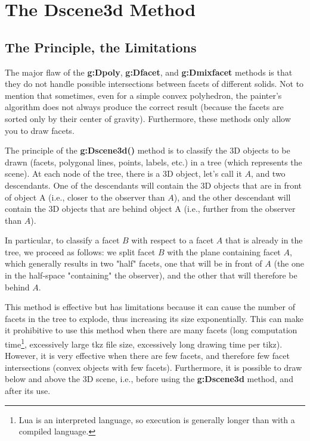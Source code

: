 \section{The Dscene3d Method}

\subsection{The Principle, the Limitations}

The major flaw of the \textbf{g:Dpoly}, \textbf{g:Dfacet}, and \textbf{g:Dmixfacet} methods is that they do not handle possible intersections between facets of different solids. Not to mention that sometimes, even for a simple convex polyhedron, the painter's algorithm does not always produce the correct result (because the facets are sorted only by their center of gravity). Furthermore, these methods only allow you to draw facets.

The principle of the \textbf{g:Dscene3d()} method is to classify the 3D objects to be drawn (facets, polygonal lines, points, labels, etc.) in a tree (which represents the scene). At each node of the tree, there is a 3D object, let's call it $A$, and two descendants. One of the descendants will contain the 3D objects that are in front of object A (i.e., closer to the observer than $A$), and the other descendant will contain the 3D objects that are behind object A (i.e., further from the observer than $A$).

In particular, to classify a facet $B$ with respect to a facet $A$ that is already in the tree, we proceed as follows: we split facet $B$ with the plane containing facet $A$, which generally results in two "half" facets, one that will be in front of $A$ (the one in the half-space "containing" the observer), and the other that will therefore be behind $A$.

This method is effective but has limitations because it can cause the number of facets in the tree to explode, thus increasing its size exponentially. This can make it prohibitive to use this method when there are many facets (long computation time\footnote{Lua is an interpreted language, so execution is generally longer than with a compiled language.}, excessively large tkz file size, excessively long drawing time per tikz). However, it is very effective when there are few facets, and therefore few facet intersections (convex objects with few facets). Furthermore, it is possible to draw below and above the 3D scene, i.e., before using the \textbf{g:Dscene3d} method, and after its use.


